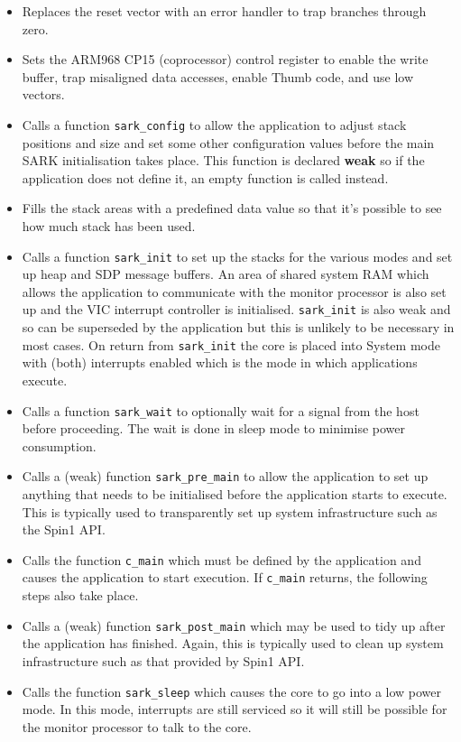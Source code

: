 \begin{itemize}
\item
Replaces the reset vector with an error handler to trap branches
through zero.

\item
Sets the ARM968 CP15 (coprocessor) control register to enable the
write buffer, trap misaligned data accesses, enable Thumb code, and
use low vectors.

\item
Calls a function \texttt{sark\_config} to allow the application to
adjust stack positions and size and set some other configuration
values before the main SARK initialisation takes place. This function
is declared \textbf{weak} so if the application does not define it, an
empty function is called instead.

\item
Fills the stack areas with a predefined data value so that it's
possible to see how much stack has been used.

\item
Calls a function \texttt{sark\_init} to set up the stacks for the
various modes and set up heap and SDP message buffers. An area of
shared system RAM which allows the application to communicate with the
monitor processor is also set up and the VIC interrupt controller is
initialised. \texttt{sark\_init} is also weak and so can be superseded
by the application but this is unlikely to be necessary in most cases.
On return from \texttt{sark\_init} the core is placed into System mode
with (both) interrupts enabled which is the mode in which applications
execute.

\item
Calls a function \texttt{sark\_wait} to optionally wait for a signal
from the host before proceeding. The wait is done in sleep mode to
minimise power consumption.

\item
Calls a (weak) function \texttt{sark\_pre\_main} to allow the
application to set up anything that needs to be initialised before the
application starts to execute. This is typically used to transparently
set up system infrastructure such as the Spin1 API.

\item
Calls the function \texttt{c\_main} which must be defined by the
application and causes the application to start execution. If
\texttt{c\_main} returns, the following steps also take place.

\item
Calls a (weak) function \texttt{sark\_post\_main} which may be used to
tidy up after the application has finished. Again, this is typically
used to clean up system infrastructure such as that provided by Spin1
API.

\item
Calls the function \texttt{sark\_sleep} which causes the core to go
into a low power mode. In this mode, interrupts are still serviced so
it will still be possible for the monitor processor to talk to the
core.

\end{itemize}

